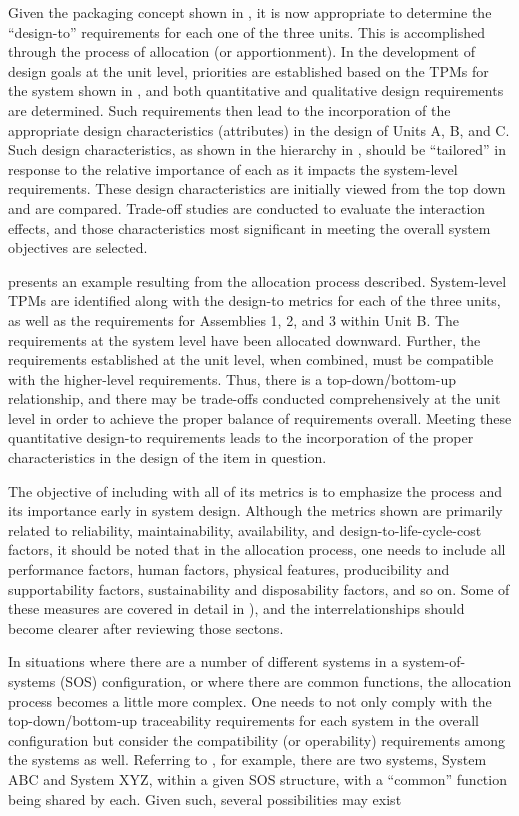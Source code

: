 Given the packaging concept shown in , it is now appropriate to determine the ``design-to'' requirements for each one of the three units. This is accomplished through the process of allocation (or apportionment). In the development of design goals at the unit level, priorities are established based on the TPMs for the system shown in , and both quantitative and qualitative design requirements are determined. Such requirements then lead to the incorporation of the appropriate design characteristics (attributes) in the design of Units A, B, and C. Such design characteristics, as shown in the hierarchy in , should be ``tailored'' in response to the relative importance of each as it impacts the system-level requirements. These design characteristics are initially viewed from the top down and are compared. Trade-off studies are conducted to evaluate the interaction effects, and those characteristics most significant in meeting the overall system objectives are selected.

presents an example resulting from the allocation process described. System-level TPMs are identified along with the design-to metrics for each of the three units, as well as the requirements for Assemblies 1, 2, and 3 within Unit B. The requirements at the system level have been allocated downward. Further, the requirements established at the unit level, when combined, must be compatible with the higher-level requirements. Thus, there is a top-down/bottom-up relationship, and there may be trade-offs conducted comprehensively at the unit level in order to achieve the proper balance of requirements overall. Meeting these quantitative design-to requirements leads to the incorporation of the proper characteristics in the design of the item in question.

The objective of including with all of its metrics is to emphasize the process and its importance early in system design. Although the metrics shown are primarily related to reliability, maintainability, availability, and design-to-life-cycle-cost factors, it should be noted that in the allocation process, one needs to include all performance factors, human factors, physical features, producibility and supportability factors, sustainability and disposability factors, and so on. Some of these measures are covered in detail in ), and the interrelationships should become clearer after reviewing those sectons.

In situations where there are a number of different systems in a system-of-systems (SOS) configuration, or where there are common functions, the allocation process becomes a little more complex. One needs to not only comply with the top-down/bottom-up traceability requirements for each system in the overall configuration but consider the compatibility (or operability) requirements among the systems as well. Referring to , for example, there are two systems, System ABC and System XYZ, within a given SOS structure, with a ``common'' function being shared by each. Given such, several possibilities may exist

